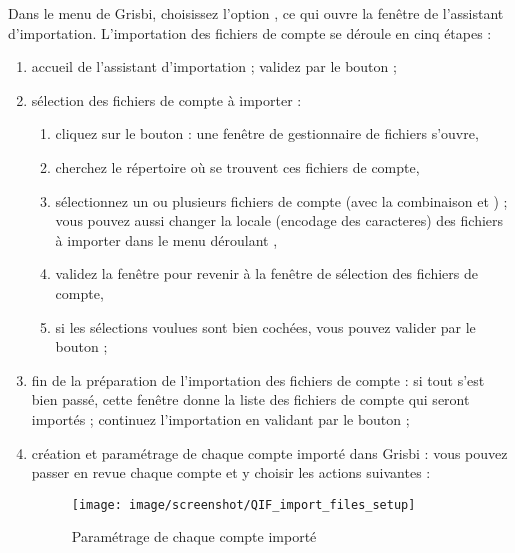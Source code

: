 Dans le menu  de Grisbi, choisissez l'option , ce qui ouvre la fenêtre de l'assistant d'importation. L'importation des fichiers de compte se déroule en cinq étapes :

\begin{enumerate}
	\item accueil de l'assistant d'importation ; validez par le bouton  ;
	\item sélection des fichiers de compte à importer :	
		\begin{enumerate}
			\item cliquez sur le bouton  : une fenêtre de gestionnaire de fichiers s'ouvre,	
			\item cherchez le répertoire où se trouvent ces fichiers de compte,
			\item sélectionnez un ou plusieurs fichiers de compte (avec la combinaison   et ) ; vous pouvez aussi changer la \gls{locale} (\gls{encodage des caracteres}) des fichiers à importer dans le menu déroulant ,
			\item validez la fenêtre pour revenir à la fenêtre de sélection des fichiers de compte,
			\item si les sélections voulues sont bien cochées, vous pouvez valider par le bouton  ;
		\end{enumerate}		  
	\item fin de la préparation de l'importation des fichiers de compte : si tout s'est bien passé, cette fenêtre donne la liste des fichiers de compte qui seront importés ; continuez l'importation en validant par le bouton  ;
	\item création et paramétrage de chaque compte importé dans Grisbi : vous pouvez passer en revue chaque compte et y choisir les actions suivantes
	 :
	\begin{figure}[htbp]
	\begin{center}
	\texttt{[image: image/screenshot/QIF\_import\_files\_setup]}
	\end{center}
	\caption{Paramétrage de chaque compte importé}
	\label{QIF-import-files-setup-img}
	\end{figure}
	

\end{enumerate}
